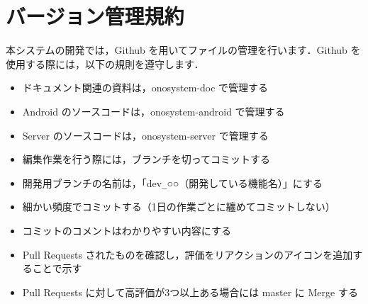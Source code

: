 \documentclass[a4j,titlepage]{jarticle}
\begin{document}
\section{バージョン管理規約}
本システムの開発では，Github を用いてファイルの管理を行います．Github を使用する際には，以下の規則を遵守します．
\begin{itemize}
\item ドキュメント関連の資料は，onosystem-doc で管理する
\item Android のソースコードは，onosystem-android で管理する
\item Server のソースコードは，onosystem-server で管理する
\item 編集作業を行う際には，ブランチを切ってコミットする
\item 開発用ブランチの名前は，「dev\verb|_|○○（開発している機能名）」にする
\item 細かい頻度でコミットする（1日の作業ごとに纏めてコミットしない）
\item コミットのコメントはわかりやすい内容にする
\item Pull Requests されたものを確認し，評価をリアクションのアイコンを追加することで示す
\item Pull Requests に対して高評価が3つ以上ある場合には master に Merge する
\end{itemize}
\end{document}
